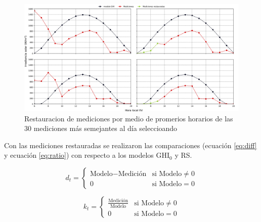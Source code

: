 \begin{figure}[H]
	\centering
	\includegraphics[width=15cm]{Graphics/example_restoration.png}
	\caption{Restauracion de mediciones por medio de promerios horarios de las 30 mediciones más semejantes al día seleccioando}
	\label{fig:restoration}
\end{figure}

Con las mediciones restauradas se realizaron las comparaciones (ecuación \ref{eq:diff} y ecuación \ref{eq:ratio}) con respecto a los modelos GHI$_0$ y RS.

\begin{equation}
	d_t = \begin{cases}
		\text{Modelo} - \text{Medición} & \text{si Modelo}\neq 0\\
		0 & \text{si Modelo} = 0
	\end{cases}
	\label{eq:diff}
\end{equation}

\begin{equation}
	k_t = \begin{cases}
		\frac{\text{Medición}}{\text{Modelo}} & \text{si Modelo}\neq 0\\
		0 & \text{si Modelo} = 0
	\end{cases}
	\label{eq:ratio}
\end{equation}
